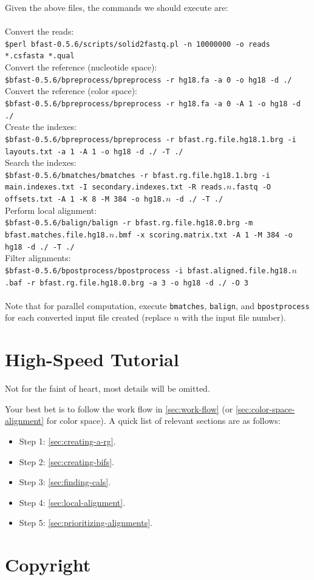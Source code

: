 \documentclass[a4paper,12pt]{book}
\newcommand{\Version}{0.5.6}
\begin{document}
Given the above files, the commands we should execute are:
\\\\
Convert the reads:\\
{\tt \scriptsize \$perl bfast-\Version{}/scripts/solid2fastq.pl -n 10000000 -o reads *.csfasta *.qual\\}
Convert the reference (nucleotide space):\\
{\tt \scriptsize \$bfast-\Version{}/bpreprocess/bpreprocess -r hg18.fa -a 0 -o hg18 -d ./\\}
Convert the reference (color space):\\
{\tt \scriptsize \$bfast-\Version{}/bpreprocess/bpreprocess -r hg18.fa -a 0 -A 1 -o hg18 -d ./\\}
Create the indexes:\\
{\tt \scriptsize \$bfast-\Version{}/bpreprocess/bpreprocess -r bfast.rg.file.hg18.1.brg -i layouts.txt -a 1 -A 1 -o hg18 -d ./ -T ./\\}
Search the indexes:\\
{\tt \scriptsize \$bfast-\Version{}/bmatches/bmatches -r bfast.rg.file.hg18.1.brg -i main.indexes.txt -I secondary.indexes.txt -R reads.$n$.fastq -O offsets.txt -A 1 -K 8 -M 384 -o hg18.$n$ -d ./ -T ./\\}
Perform local alignment:\\
{\tt \scriptsize \$bfast-\Version{}/balign/balign -r bfast.rg.file.hg18.0.brg -m bfast.matches.file.hg18.$n$.bmf -x scoring.matrix.txt -A 1 -M 384 -o hg18 -d ./ -T ./\\}
Filter alignments:\\
{\tt \scriptsize \$bfast-\Version{}/bpostprocess/bpostprocess -i bfast.aligned.file.hg18.$n$.baf -r bfast.rg.file.hg18.0.brg -a 3 -o hg18 -d ./ -O 3\\}
\\
Note that for parallel computation, execute {\tt bmatches}, {\tt balign}, and {\tt bpostprocess} for each converted input file created (replace $n$ with the input file number).

\section{High-Speed Tutorial}
\label{sec:high-speed-tutorial}
Not for the faint of heart, most details will be omitted.

Your best bet is to follow the work flow in \autoref{sec:work-flow} (or \autoref{sec:color-space-alignment} for color space).
A quick list of relevant sections are as follows:
\begin{itemize}
	\item Step 1: \autoref{sec:creating-a-rg}.
	\item Step 2: \autoref{sec:creating-bifs}.
	\item Step 3: \autoref{sec:finding-cals}.
	\item Step 4: \autoref{sec:local-alignment}.
	\item Step 5: \autoref{sec:prioritizing-alignments}.
\end{itemize}
\section{Copyright}


{}


\end{document}
